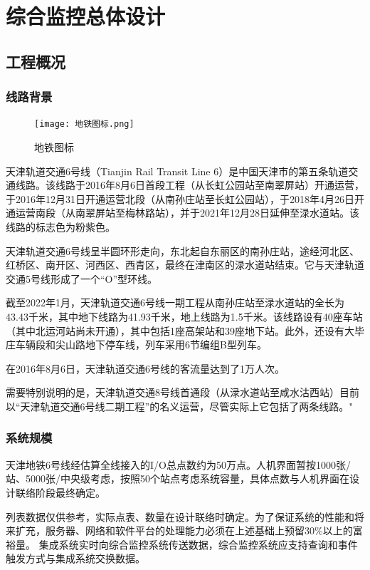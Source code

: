 \chapter{综合监控总体设计}
\section{工程概况}
\subsection{线路背景}
\begin{figure}[h]
	\centering
	\texttt{[image: 地铁图标.png]}
	\caption{地铁图标}
\end{figure}
天津轨道交通6号线（Tianjin Rail Transit Line 6）是中国天津市的第五条轨道交通线路。该线路于2016年8月6日首段工程（从长虹公园站至南翠屏站）开通运营，于2016年12月31日开通运营北段（从南孙庄站至长虹公园站），于2018年4月26日开通运营南段（从南翠屏站至梅林路站），并于2021年12月28日延伸至渌水道站。该线路的标志色为粉紫色。

天津轨道交通6号线呈半圆环形走向，东北起自东丽区的南孙庄站，途经河北区、红桥区、南开区、河西区、西青区，最终在津南区的渌水道站结束。它与天津轨道交通5号线形成了一个“O”型环线。

截至2022年1月，天津轨道交通6号线一期工程从南孙庄站至渌水道站的全长为43.43千米，其中地下线路为41.93千米，地上线路为1.5千米。该线路设有40座车站（其中北运河站尚未开通），其中包括1座高架站和39座地下站。此外，还设有大毕庄车辆段和尖山路地下停车线，列车采用6节编组B型列车。

在2016年8月6日，天津轨道交通6号线的客流量达到了1万人次。

需要特别说明的是，天津轨道交通8号线首通段（从渌水道站至咸水沽西站）目前以“天津轨道交通6号线二期工程”的名义运营，尽管实际上它包括了两条线路。"

\subsection{系统规模}

天津地铁6号线经估算全线接入的I/O总点数约为50万点。人机界面暂按1000张/站、5000张/中央级考虑，按照50个站点考虑系统容量，具体点数与人机界面在设计联络阶段最终确定。 

列表数据仅供参考，实际点表、数量在设计联络时确定。为了保证系统的性能和将来扩充，服务器、网络和软件平台的处理能力必须在上述基础上预留30\%以上的富裕量。 集成系统实时向综合监控系统传送数据，综合监控系统应支持查询和事件触发方式与集成系统交换数据。

